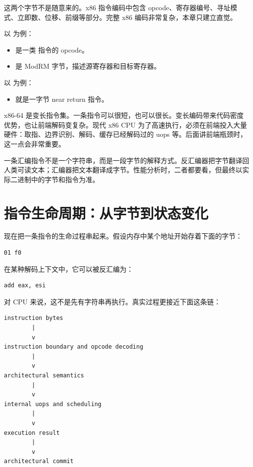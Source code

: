 这两个字节不是随意来的。x86 指令编码中包含 opcode、寄存器编号、寻址模式、立即数、位移、前缀等部分。完整 x86 编码非常复杂，本章只建立直觉。

以  为例：

\begin{itemize}
  \item {} 是一类  指令的 opcode。
  \item {} 是 ModRM 字节，描述源寄存器和目标寄存器。
\end{itemize}

以  为例：

\begin{itemize}
  \item {} 就是一字节 near return 指令。
\end{itemize}

x86-64 是变长指令集。一条指令可以很短，也可以很长。变长编码带来代码密度优势，也让前端解码变复杂。现代 x86 CPU 为了高速执行，必须在前端投入大量硬件：取指、边界识别、解码、缓存已经解码过的 uops 等。后面讲前端瓶颈时，这一点会非常重要。

\begin{mentalmodel}
一条汇编指令不是一个字符串，而是一段字节的解释方式。反汇编器把字节翻译回人类可读文本；汇编器把文本翻译成字节。性能分析时，二者都要看，但最终以实际二进制中的字节和指令为准。
\end{mentalmodel}

\section{指令生命周期：从字节到状态变化}

现在把一条指令的生命过程串起来。假设内存中某个地址开始存着下面的字节：

\begin{lstlisting}
01 f0
\end{lstlisting}

在某种解码上下文中，它可以被反汇编为：

\begin{lstlisting}
add eax, esi
\end{lstlisting}

对 CPU 来说，这不是先有字符串再执行。真实过程更接近下面这条链：

\begin{center}
\begin{minipage}{0.86\linewidth}
\begin{verbatim}
instruction bytes
        |
        v
instruction boundary and opcode decoding
        |
        v
architectural semantics
        |
        v
internal uops and scheduling
        |
        v
execution result
        |
        v
architectural commit
\end{verbatim}
\end{minipage}
\end{center}

